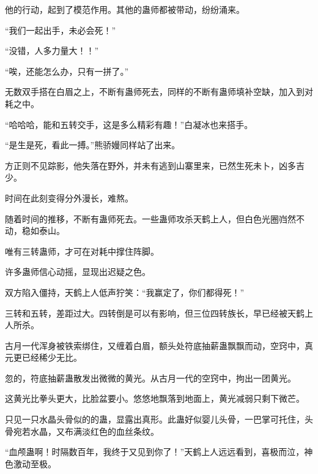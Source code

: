 \begin{this_body}
他的行动，起到了模范作用。其他的蛊师都被带动，纷纷涌来。

“我们一起出手，未必会死！”

“没错，人多力量大！！”

“唉，还能怎么办，只有一拼了。”

无数双手搭在白眉之上，不断有蛊师死去，同样的不断有蛊师填补空缺，加入到对耗之中。

“哈哈哈，能和五转交手，这是多么精彩有趣！”白凝冰也来搭手。

“是生是死，看此一搏。”熊骄嫚同样站了出来。

方正则不见踪影，他失落在野外，并未有逃到山寨里来，已然生死未卜，凶多吉少。

时间在此刻变得分外漫长，难熬。

随着时间的推移，不断有蛊师死去。一些蛊师攻杀天鹤上人，但白色光圈岿然不动，稳如泰山。

唯有三转蛊师，才可在对耗中撑住阵脚。

许多蛊师信心动摇，显现出迟疑之色。

双方陷入僵持，天鹤上人低声狞笑：“我赢定了，你们都得死！”

三转和五转，差距过大。四转倒是可以有影响，但三位四转族长，早已经被天鹤上人所杀。

古月一代浑身被铁索绑住，又缠着白眉，额头处符底抽薪蛊飘飘而动，空窍中，真元更已经稀少无比。

忽的，符底抽薪蛊散发出微微的黄光。从古月一代的空窍中，拘出一团黄光。

这黄光比拳头更大，比脸盆要小。悠悠地飘落到地面上，黄光减弱只剩下微芒。

只见一只水晶头骨似的的蛊，显露出真形。此蛊好似婴儿头骨，一巴掌可托住，头骨宛若水晶，又布满淡红色的血丝条纹。

“血颅蛊啊！时隔数百年，我终于又见到你了！”天鹤上人远远看到，喜极而泣，神色激动至极。

\end{this_body}

